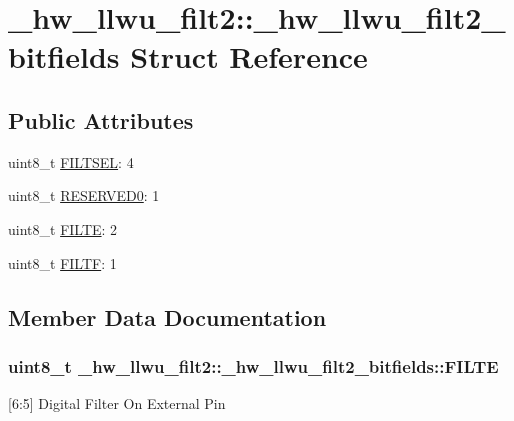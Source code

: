 \hypertarget{struct__hw__llwu__filt2_1_1__hw__llwu__filt2__bitfields}{}\section{\+\_\+hw\+\_\+llwu\+\_\+filt2\+:\+:\+\_\+hw\+\_\+llwu\+\_\+filt2\+\_\+bitfields Struct Reference}
\label{struct__hw__llwu__filt2_1_1__hw__llwu__filt2__bitfields}
\subsection*{Public Attributes}
\begin{DoxyCompactItemize}
\item 
uint8\+\_\+t \hyperlink{struct__hw__llwu__filt2_1_1__hw__llwu__filt2__bitfields_ad27c71c68f9aa0314dc5ffbc75186556}{F\+I\+L\+T\+S\+EL}\+: 4
\item 
uint8\+\_\+t \hyperlink{struct__hw__llwu__filt2_1_1__hw__llwu__filt2__bitfields_a6c7bfa78af736cf2f90c09049979378a}{R\+E\+S\+E\+R\+V\+E\+D0}\+: 1
\item 
uint8\+\_\+t \hyperlink{struct__hw__llwu__filt2_1_1__hw__llwu__filt2__bitfields_a42c09de32143991f6967f916f941d515}{F\+I\+L\+TE}\+: 2
\item 
uint8\+\_\+t \hyperlink{struct__hw__llwu__filt2_1_1__hw__llwu__filt2__bitfields_ad9d1c360910f9b1018a8cfd38fdf9ec2}{F\+I\+L\+TF}\+: 1
\end{DoxyCompactItemize}


\subsection{Member Data Documentation}
\subsubsection[{\texorpdfstring{F\+I\+L\+TE}{FILTE}}]{\setlength{\rightskip}{0pt plus 5cm}uint8\+\_\+t \+\_\+hw\+\_\+llwu\+\_\+filt2\+::\+\_\+hw\+\_\+llwu\+\_\+filt2\+\_\+bitfields\+::\+F\+I\+L\+TE}\hypertarget{struct__hw__llwu__filt2_1_1__hw__llwu__filt2__bitfields_a42c09de32143991f6967f916f941d515}{}\label{struct__hw__llwu__filt2_1_1__hw__llwu__filt2__bitfields_a42c09de32143991f6967f916f941d515}
\mbox{[}6\+:5\mbox{]} Digital Filter On External Pin 
